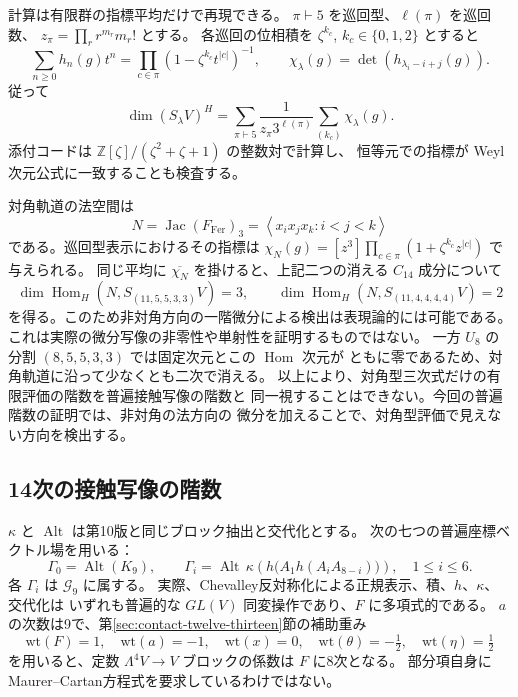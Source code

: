 \documentclass[a4paper,11pt]{ltjsarticle}
\theoremstyle{definition}
\begin{document}
計算は有限群の指標平均だけで再現できる。
\(\pi\vdash5\) を巡回型、\(\ell(\pi)\) を巡回数、
\(z_\pi=\prod_r r^{m_r}m_r!\) とする。
各巡回の位相積を \(\zeta^{k_c}\), \(k_c\in\{0,1,2\}\) とすると
\[
 \sum_{n\geq0}h_n(g)t^n
 =\prod_{c\in\pi}(1-\zeta^{k_c}t^{|c|})^{-1},\qquad
 \chi_\lambda(g)=\det(h_{\lambda_i-i+j}(g)).
\]
従って
\[
 \dim(S_\lambda V)^H
 =\sum_{\pi\vdash5}\frac{1}{z_\pi3^{\ell(\pi)}}
   \sum_{(k_c)}\chi_\lambda(g).
\]
添付コードは \(\mathbb Z[\zeta]/(\zeta^2+\zeta+1)\) の整数対で計算し、
恒等元での指標が Weyl 次元公式に一致することも検査する。

対角軌道の法空間は
\[
 N=\operatorname{Jac}(F_{\mathrm{Fer}})_3
 =\left\langle x_ix_jx_k:i<j<k\right\rangle
\]
である。巡回型表示におけるその指標は
\(\chi_N(g)=[z^3]\prod_{c\in\pi}(1+\zeta^{k_c}z^{|c|})\) で与えられる。
同じ平均に \(\overline{\chi_N}\) を掛けると、上記二つの消える
\(C_{14}\) 成分について
\[
 \dim\operatorname{Hom}_H(N,S_{(11,5,5,3,3)}V)=3,\qquad
 \dim\operatorname{Hom}_H(N,S_{(11,4,4,4,4)}V)=2
\]
を得る。このため非対角方向の一階微分による検出は表現論的には可能である。
これは実際の微分写像の非零性や単射性を証明するものではない。
一方 \(U_8\) の分割 \((8,5,5,3,3)\) では固定次元とこの \(\operatorname{Hom}\) 次元が
ともに零であるため、対角軌道に沿って少なくとも二次で消える。
以上により、対角型三次式だけの有限評価の階数を普遍接触写像の階数と
同一視することはできない。今回の普遍階数の証明では、非対角の法方向の
微分を加えることで、対角型評価で見えない方向を検出する。

\subsection{14次の接触写像の階数}
\label{subsec:v11-contact-rank-fourteenth}

$\kappa$ と $\operatorname{Alt}$ は第10版と同じブロック抽出と交代化とする。
次の七つの普遍座標ベクトル場を用いる：
\[
 \Gamma_0=\operatorname{Alt}(K_9),\qquad
 \Gamma_i=\operatorname{Alt}\,\kappa\!\left(
       h\bigl(A_1h(A_iA_{8-i})\bigr)\right),\quad 1\le i\le6.
\]
各 $\Gamma_i$ は $\mathcal G_9$ に属する。
実際、Chevalley反対称化による正規表示、積、$h$、$\kappa$、交代化は
いずれも普遍的な $GL(V)$ 同変操作であり、$F$ に多項式的である。
$a$ の次数は9で、第\ref{sec:contact-twelve-thirteen}節の補助重み
\[
 \mathrm{wt}(F)=1,\quad\mathrm{wt}(a)=-1,\quad
 \mathrm{wt}(x)=0,\quad\mathrm{wt}(\theta)=-\tfrac12,
 \quad\mathrm{wt}(\eta)=\tfrac12
\]
を用いると、定数 $\Lambda^4V\to V$ ブロックの係数は $F$ に8次となる。
部分項自身にMaurer--Cartan方程式を要求しているわけではない。
\end{document}
